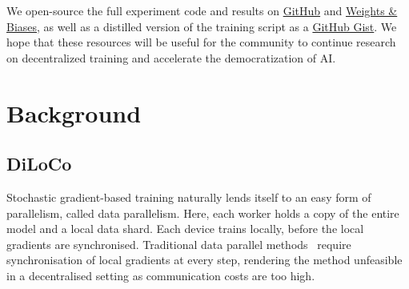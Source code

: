 \documentclass[conference, 10pt]{IEEEtran}
\begin{document}
We open-source the full experiment code and results on \href{https://github.com/mikasenghaas/swarm}{GitHub} and \href{https://wandb.ai/mikasenghaas/swarm}{Weights \& Biases}, as well as a distilled version of the training script as a \href{https://gist.github.com/mikasenghaas/5fa1aa77ea69f187f531a5889983c249}{GitHub Gist}. We hope that these resources will be useful for the community to continue research on decentralized training
and accelerate the democratization of AI.

\section{Background}
\label{sec:background}




\subsection{DiLoCo}
\label{subsec:diloco}

Stochastic gradient-based training naturally lends itself to an easy form of
parallelism, called data parallelism. Here, each worker holds a copy of the
entire model and a local data shard. Each device trains locally, before the local
gradients are synchronised. Traditional data parallel methods~\cite{mcmahan2016}
require synchronisation of local gradients at every step, rendering the method
unfeasible in a decentralised setting as communication costs are too high.
\end{document}
